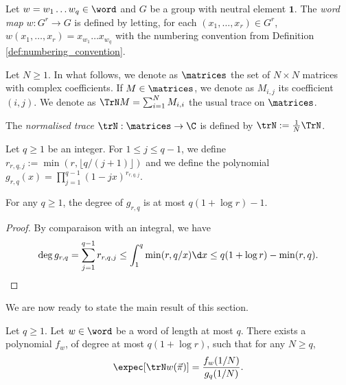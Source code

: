 \begin{definition}
  \label{def:word_map}
  Let $w = w_1 \ldots w_q \in \word$
  and $G$ be a group with neutral element $\mathbf{1}$.
  The \emph{word map} $w : G^r \rightarrow G$ is defined by
  letting, for each $(x_1, \ldots, x_r) \in G^r$,
  $w(x_1, \ldots, x_r) = x_{w_1} \ldots x_{w_q}$
  with the numbering convention from Definition \ref{def:numbering_convention}.
\end{definition}

Let $N \geq 1$.
In what follows, we denote as $\matrices$ the set of $N \times N$ matrices with complex coefficients.
If $M \in \matrices$, we denote as $M_{i,j}$ its coefficient $(i,j)$.
We denote as $\TrN M = \sum_{i=1}^N M_{i,i}$ the usual trace on $\matrices$.

\begin{definition}
  \label{def:normalised_trace}
  The \emph{normalised trace} $\trN : \matrices \rightarrow \C$ is defined by $\trN := \frac{1}{N} \TrN$.
\end{definition}

\begin{definition}
  \label{def:gq}
  Let $q \geq 1$ be an integer.
  For $1 \leq j \leq q-1$, we define $r_{r,q,j} := \min (r, \lfloor q/(j+1) \rfloor)$
  and
  we define the polynomial $g_{r,q}(x) = \prod_{j=1}^{q-1} (1-j x)^{r_{r,q,j}}$.
\end{definition}

\begin{lemma}
  \label{lem:degree_gq}
  For any $q \geq 1$, the degree of $g_{r,q}$ is at most $q(1+\log r)-1$.
\end{lemma}

\begin{proof}
  By comparaison with an integral, we have
  \begin{align*}
    \deg g_{r,q}
    = \sum_{j=1}^{q-1} r_{r,q,j}
    \leq \int_1^q \min(r, q/x) \d x
    \leq q(1+\log r) - \min(r,q).
  \end{align*}
\end{proof}

We are now ready to state the main result of this section.

\begin{theorem}
  \label{thm:expectation_word_formula}
  \notready
  Let $q \geq 1$.
  Let $w \in \word$ be a word of length at most $q$.
  There exists a polynomial $f_w$, of degree at most $q(1+\log r)$, such that for any $N \geq q$,
  \begin{equation*}
    \expec [\trN w(\vec \pi)] = \frac{f_w(1/N)}{g_q(1/N)}.
  \end{equation*}
\end{theorem}


